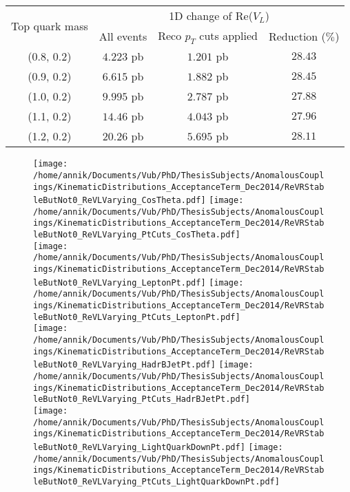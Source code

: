 \begin{table}[h!]
 \centering
 \begin{tabular}{|c|c|c|c|}
  \hline
  \multirow{2}{*}{Top quark mass} 	&  \multicolumn{3}{|c|}{1D change of Re($V_L$)}				\\
					&  All events	& Reco $p_T$ cuts applied	& Reduction ($\%$) 	\\
  \hline
    (0.8, 0.2) 				& $4.223$ pb	& $1.201$ pb			& $28.43$ 		\\
    (0.9, 0.2)				& $6.615$ pb	& $1.882$ pb			& $28.45$		\\
    (1.0, 0.2)				& $9.995$ pb	& $2.787$ pb			& $27.88$ 		\\
    (1.1, 0.2)				& $14.46$ pb	& $4.043$ pb			& $27.96$ 		\\
    (1.2, 0.2)				& $20.26$ pb	& $5.695$ pb			& $28.11$ 		\\
  \hline 
 \end{tabular} 
 \caption{} \label{table::XSChangeAccVLNot0}
\end{table}

\begin{figure}[!h]
 \centering
 \texttt{[image: /home/annik/Documents/Vub/PhD/ThesisSubjects/AnomalousCouplings/KinematicDistributions\_AcceptanceTerm\_Dec2014/ReVRStableButNot0\_ReVLVarying\_CosTheta.pdf]}
 \texttt{[image: /home/annik/Documents/Vub/PhD/ThesisSubjects/AnomalousCouplings/KinematicDistributions\_AcceptanceTerm\_Dec2014/ReVRStableButNot0\_ReVLVarying\_PtCuts\_CosTheta.pdf]}\\
 \texttt{[image: /home/annik/Documents/Vub/PhD/ThesisSubjects/AnomalousCouplings/KinematicDistributions\_AcceptanceTerm\_Dec2014/ReVRStableButNot0\_ReVLVarying\_LeptonPt.pdf]}
 \texttt{[image: /home/annik/Documents/Vub/PhD/ThesisSubjects/AnomalousCouplings/KinematicDistributions\_AcceptanceTerm\_Dec2014/ReVRStableButNot0\_ReVLVarying\_PtCuts\_LeptonPt.pdf]}\\
 \texttt{[image: /home/annik/Documents/Vub/PhD/ThesisSubjects/AnomalousCouplings/KinematicDistributions\_AcceptanceTerm\_Dec2014/ReVRStableButNot0\_ReVLVarying\_HadrBJetPt.pdf]}
 \texttt{[image: /home/annik/Documents/Vub/PhD/ThesisSubjects/AnomalousCouplings/KinematicDistributions\_AcceptanceTerm\_Dec2014/ReVRStableButNot0\_ReVLVarying\_PtCuts\_HadrBJetPt.pdf]}\\
 \texttt{[image: /home/annik/Documents/Vub/PhD/ThesisSubjects/AnomalousCouplings/KinematicDistributions\_AcceptanceTerm\_Dec2014/ReVRStableButNot0\_ReVLVarying\_LightQuarkDownPt.pdf]}
 \texttt{[image: /home/annik/Documents/Vub/PhD/ThesisSubjects/AnomalousCouplings/KinematicDistributions\_AcceptanceTerm\_Dec2014/ReVRStableButNot0\_ReVLVarying\_PtCuts\_LightQuarkDownPt.pdf]}
 \caption{}
 \label{fig::KinChangeNot0}
\end{figure}


